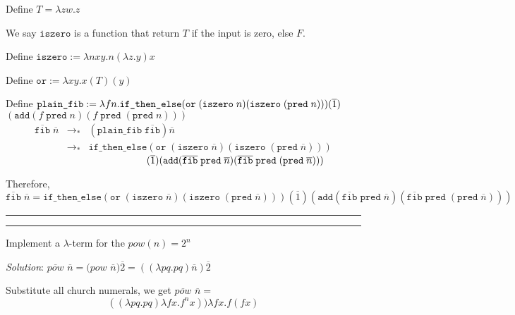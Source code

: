 \documentclass[a4paper, 11pt]{article}
\newcommand{\question}[2] {\vspace{.25in} \hrule\vspace{0.5em}
	\noindent{\bf #1: #2} \vspace{0.5em}
	\hrule \vspace{.10in}}
\newcommand\tab[1][1cm]{\hspace*{#1}}
\begin{document}
	Define $T = \lambda zw. z$
	
	We say $\texttt{iszero}$ is a function that return $T$ if the input is zero, else $F$.
	
	Define $\texttt{iszero} := \lambda nxy.n(\lambda z.y)x$
	
	Define $\texttt{or} := \lambda xy.x(T)(y)$
	
	Define $\texttt{plain\_fib} := \lambda fn.\texttt{if\_then\_else}
	(\texttt{or}\; (\texttt{iszero}\;n)(\texttt{iszero}\;(\texttt{pred}\;n)))
	(\overline{1})\\$
	\tab[3.5cm] $(\texttt{add} (f\;\texttt{pred}\; n) (f\;\texttt{pred}\;(\texttt{pred}\;n) ))
	$
	\begin{eqnarray}
	\overline{\texttt{fib} }\;\overline{n} &\rightarrow_*& (\texttt{plain\_fib} \; \overline{\texttt{fib}}) \overline{n}\\
	&\rightarrow_*& \texttt{if\_then\_else}
	(\texttt{or}\; (\texttt{iszero}\;\overline{n})(\texttt{iszero}\;(\texttt{pred}\;\overline{n})))
	\end{eqnarray}
	$\tab[5cm] (\overline{1})(\texttt{add} (\overline{\texttt{fib} }\;\texttt{pred}\; \overline{n}) (\overline{\texttt{fib} }\;\texttt{pred}\;(\texttt{pred}\;\overline{n}) ))$
	
	Therefore,
	$$\overline{\texttt{fib} }\;\overline{n} = \texttt{if\_then\_else}
	(\texttt{or}\; (\texttt{iszero}\;\overline{n})(\texttt{iszero}\;(\texttt{pred}\;\overline{n})))
 (\overline{1})(\texttt{add} (\overline{\texttt{fib} }\;\texttt{pred}\; \overline{n}) (\overline{\texttt{fib} }\;\texttt{pred}\;(\texttt{pred}\;\overline{n}) ))$$
	\question{9}{Power Of 2}

	Implement a  $ \lambda $-term for the $pow(n) = 2^n$
	
	{\em Solution}: $\overline{pow}$ $\overline{n} 
	=  (pow$ $\overline{n}) \overline{2} 
	=  ((\lambda p q . p q) \overline{n}) \overline{2} 
	$
	
	Substitute all church numerals, we get  $\overline{pow}$ $\overline{n} =$
	$$  ((\lambda p q . p q) \lambda f x. f^n x)) \lambda f x. f ( f x) $$
	
	
\end{document}
